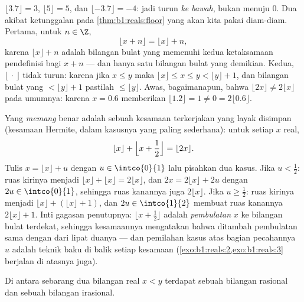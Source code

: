 \begin{example}\label{ex:b1:reals:floorpractice}
$\lfloor 3.7 \rfloor = 3$, $\lfloor 5 \rfloor = 5$, dan $\lfloor
-3.7 \rfloor = -4$: jadi  turun \emph{ke bawah}, bukan menuju $0$.
Dua akibat ketunggalan pada \cref{thm:b1:reals:floor} yang
akan kita pakai diam-diam. Pertama, untuk $n \in \Z$,
\[
\lfloor x + n \rfloor = \lfloor x \rfloor + n ,
\]
karena $\lfloor x \rfloor + n$ adalah bilangan bulat yang memenuhi kedua
ketaksamaan pendefinisi bagi $x + n$ --- dan hanya satu bilangan bulat yang demikian.
Kedua, $\lfloor \, \cdot \, \rfloor$ tidak turun: karena jika $x \leq
y$ maka $\lfloor x \rfloor \leq x \leq y < \lfloor y \rfloor + 1$,
dan bilangan bulat yang $< \lfloor y \rfloor + 1$ pastilah $\leq \lfloor y
\rfloor$. Awas, bagaimanapun, bahwa $\lfloor 2x \rfloor \neq 2\lfloor
x \rfloor$ pada umumnya: karena $x = 0.6$ memberikan $\lfloor 1.2 \rfloor = 1
\neq 0 = 2\lfloor 0.6 \rfloor$.

Yang \emph{memang} benar adalah sebuah kesamaan terkerjakan yang layak disimpan (kesamaan
Hermite, dalam kasusnya yang paling sederhana): untuk setiap $x$ real,
\[
\lfloor x \rfloor + \Bigl\lfloor x + \frac12 \Bigr\rfloor
= \lfloor 2x \rfloor .
\]
Tulis $x = \lfloor x\rfloor + u$ dengan $u \in \intco{0}{1}$ lalu
pisahkan dua kasus. Jika $u < \frac12$: ruas kirinya menjadi $\lfloor
x\rfloor + \lfloor x\rfloor = 2\lfloor x\rfloor$, dan $2x =
2\lfloor x\rfloor + 2u$ dengan $2u \in \intco{0}{1}$, sehingga ruas
kanannya juga $2\lfloor x\rfloor$. Jika $u \geq \frac12$: ruas
kirinya menjadi $\lfloor x\rfloor + (\lfloor x\rfloor + 1)$, dan $2u \in
\intco{1}{2}$ membuat ruas kanannya $2\lfloor x\rfloor + 1$. Inti
gagasan penutupnya: $\lfloor x + \frac12\rfloor$ adalah
\emph{pembulatan} $x$ ke bilangan bulat terdekat, sehingga kesamaannya
mengatakan bahwa  ditambah pembulatan sama dengan  dari lipat duanya --- dan
pemilahan kasus atas bagian pecahannya $u$ adalah teknik
baku di balik setiap kesamaan 
(\cref{exo:b1:reals:2,exo:b1:reals:3} berjalan di atasnya juga).
\end{example}

\begin{theorem}\label{thm:b1:reals:density}
Di antara sebarang dua bilangan real $x < y$ terdapat sebuah bilangan rasional dan sebuah
bilangan irasional.
\end{theorem}

